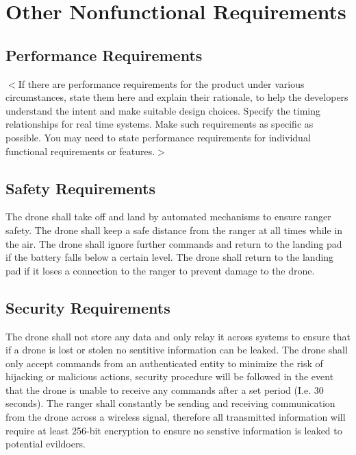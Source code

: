 \chapter{Other Nonfunctional Requirements}

\section{Performance Requirements}
$<$If there are performance requirements for the product under various
circumstances, state them here and explain their rationale, to help the
developers understand the intent and make suitable design choices. Specify the
timing relationships for real time systems. Make such requirements as specific
as possible. You may need to state performance requirements for individual
functional requirements or features.$>$

\section{Safety Requirements}
The drone shall take off and land by automated mechanisms to ensure ranger safety.
\newline
The drone shall keep a safe distance from the ranger at all times while in the air.
\newline
The drone shall ignore further commands and return to the landing pad if the battery falls below a certain level.
\newline
The drone shall return to the landing pad if it loses a connection to the ranger to prevent damage to the drone.
\newline

\section{Security Requirements}
The drone shall not store any data and only relay it across systems to ensure that if a drone is lost or stolen no sentitive information can be leaked.
\newline
The drone shall only accept commands from an authenticated entity to minimize the risk of hijacking or malicious actions, 
security procedure will be followed in the event that the drone is unable to receive any commands after a set period (I.e. 30 seconds).
\newline
The ranger shall constantly be sending and receiving communication from the drone across a wireless signal,
therefore all transmitted information will require at least 256-bit encryption to ensure no senstive information is leaked to potential evildoers.
\newline

